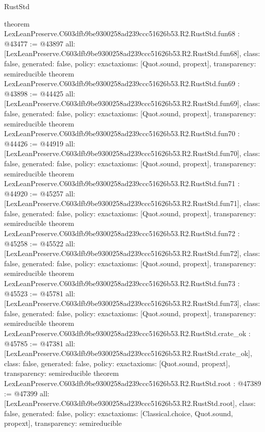 \begin{lexlean}{RustStd}
\begin{coremodule}
{}
theorem LexLeanPreserve.C603dfb9be9300258ad239ccc51626b53.R2.RustStd.fun68 : @43477 := @43897 {
  all: [LexLeanPreserve.C603dfb9be9300258ad239ccc51626b53.R2.RustStd.fun68],
  class: false,
  generated: false,
  policy: exact{axioms: [Quot.sound, propext]},
  transparency: semireducible
}
theorem LexLeanPreserve.C603dfb9be9300258ad239ccc51626b53.R2.RustStd.fun69 : @43898 := @44425 {
  all: [LexLeanPreserve.C603dfb9be9300258ad239ccc51626b53.R2.RustStd.fun69],
  class: false,
  generated: false,
  policy: exact{axioms: [Quot.sound, propext]},
  transparency: semireducible
}
theorem LexLeanPreserve.C603dfb9be9300258ad239ccc51626b53.R2.RustStd.fun70 : @44426 := @44919 {
  all: [LexLeanPreserve.C603dfb9be9300258ad239ccc51626b53.R2.RustStd.fun70],
  class: false,
  generated: false,
  policy: exact{axioms: [Quot.sound, propext]},
  transparency: semireducible
}
theorem LexLeanPreserve.C603dfb9be9300258ad239ccc51626b53.R2.RustStd.fun71 : @44920 := @45257 {
  all: [LexLeanPreserve.C603dfb9be9300258ad239ccc51626b53.R2.RustStd.fun71],
  class: false,
  generated: false,
  policy: exact{axioms: [Quot.sound, propext]},
  transparency: semireducible
}
theorem LexLeanPreserve.C603dfb9be9300258ad239ccc51626b53.R2.RustStd.fun72 : @45258 := @45522 {
  all: [LexLeanPreserve.C603dfb9be9300258ad239ccc51626b53.R2.RustStd.fun72],
  class: false,
  generated: false,
  policy: exact{axioms: [Quot.sound, propext]},
  transparency: semireducible
}
theorem LexLeanPreserve.C603dfb9be9300258ad239ccc51626b53.R2.RustStd.fun73 : @45523 := @45781 {
  all: [LexLeanPreserve.C603dfb9be9300258ad239ccc51626b53.R2.RustStd.fun73],
  class: false,
  generated: false,
  policy: exact{axioms: [Quot.sound, propext]},
  transparency: semireducible
}
theorem LexLeanPreserve.C603dfb9be9300258ad239ccc51626b53.R2.RustStd.crate_ok : @45785 := @47381 {
  all: [LexLeanPreserve.C603dfb9be9300258ad239ccc51626b53.R2.RustStd.crate_ok],
  class: false,
  generated: false,
  policy: exact{axioms: [Quot.sound, propext]},
  transparency: semireducible
}
theorem LexLeanPreserve.C603dfb9be9300258ad239ccc51626b53.R2.RustStd.root : @47389 := @47399 {
  all: [LexLeanPreserve.C603dfb9be9300258ad239ccc51626b53.R2.RustStd.root],
  class: false,
  generated: false,
  policy: exact{axioms: [Classical.choice, Quot.sound, propext]},
  transparency: semireducible
}


\end{coremodule}
\end{lexlean}

